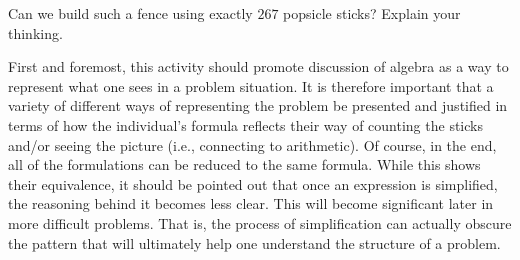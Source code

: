 \documentclass{ximera}
\begin{document}
\begin{problem}
Can we build such a fence using exactly $267$ popsicle sticks? Explain your thinking.
\end{problem}


\newpage
\begin{instructorNotes}

First and foremost, this activity should promote discussion of algebra as a way to represent what one sees in a problem situation. It is therefore important that a variety of different ways of representing the problem be presented and justified in terms of how the individual's formula reflects their way of counting the sticks and/or seeing the picture (i.e., connecting to arithmetic). Of course, in the end, all of the formulations can be reduced to the same formula. While this shows their equivalence, it should be pointed out that once an expression is simplified, the reasoning behind it becomes less clear. This will become significant later in more difficult problems. That is, the process of simplification can actually obscure the pattern that will ultimately help one understand the structure of a problem.


\end{instructorNotes}
\end{document}
